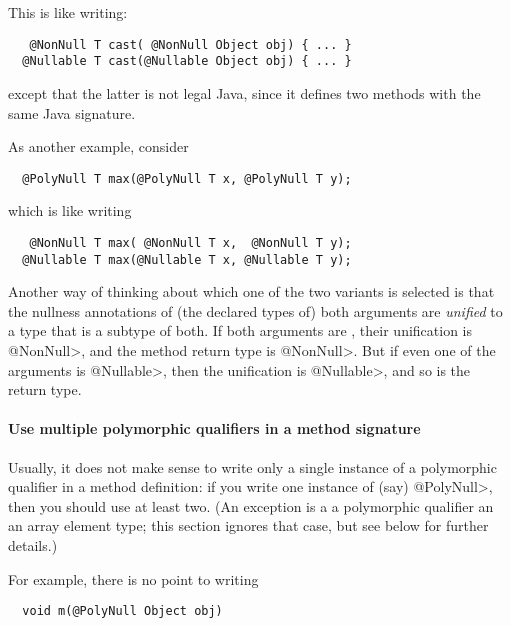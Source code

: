 \noindent
This is like writing:

\begin{Verbatim}
   @NonNull T cast( @NonNull Object obj) { ... }
  @Nullable T cast(@Nullable Object obj) { ... }
\end{Verbatim}

\noindent
except that the latter is not legal Java, since it defines two
methods with the same Java signature.


As another example, consider

\begin{Verbatim}
  @PolyNull T max(@PolyNull T x, @PolyNull T y);
\end{Verbatim}

\noindent
which is like writing

\begin{Verbatim}
   @NonNull T max( @NonNull T x,  @NonNull T y);
  @Nullable T max(@Nullable T x, @Nullable T y);
\end{Verbatim}

\noindent
Another way of thinking about which one of the two  variants is
selected is that the nullness annotations of (the declared types of) both
arguments are \emph{unified} to a type that is a subtype of both.  If both
arguments are , their unification is \<@NonNull>, and the
method return type is \<@NonNull>.  But if even one of the arguments is \<@Nullable>,
then the unification is \<@Nullable>, and so is the return type.


\paragraph{Use multiple polymorphic qualifiers in a method signature\label{qualifier-polymorphism-multiple-qualifiers}}


Usually, it does not make sense to write only a single instance of a polymorphic
qualifier in a method definition:  if you write one instance of (say)
\<@PolyNull>, then you should use at least two.  (An exception is a a
polymorphic qualifier an an array element type; this section ignores that
case, but see below for further details.)

For example, there is no point to writing

\begin{Verbatim}
  void m(@PolyNull Object obj)
\end{Verbatim}

